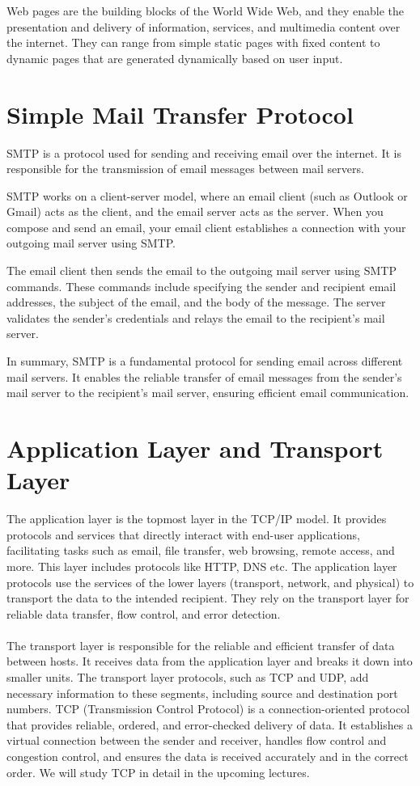\documentclass[a4paper,11pt]{scrarticle}
\begin{document}
Web pages are the building blocks of the World Wide Web, and they enable the presentation and delivery of information, services, and multimedia content over the internet. They can range from simple static pages with fixed content to dynamic pages that are generated dynamically based on user input.



\section{Simple Mail Transfer Protocol}
SMTP is a protocol used for sending and receiving email over the internet. It is responsible for the transmission of email messages between mail servers.

SMTP works on a client-server model, where an email client (such as Outlook or Gmail) acts as the client, and the email server acts as the server. When you compose and send an email, your email client establishes a connection with your outgoing mail server using SMTP.

The email client then sends the email to the outgoing mail server using SMTP commands. These commands include specifying the sender and recipient email addresses, the subject of the email, and the body of the message. The server validates the sender's credentials and relays the email to the recipient's mail server.

In summary, SMTP is a fundamental protocol for sending email across different mail servers. It enables the reliable transfer of email messages from the sender's mail server to the recipient's mail server, ensuring efficient email communication.


\section{Application Layer and Transport Layer}
The application layer is the topmost layer in the TCP/IP model. It provides protocols and services that directly interact with end-user applications, facilitating tasks such as email, file transfer, web browsing, remote access, and more. This layer includes protocols like HTTP, DNS etc. The application layer protocols use the services of the lower layers (transport, network, and physical) to transport the data to the intended recipient. They rely on the transport layer for reliable data transfer, flow control, and error detection.\\\\
The transport layer is responsible for the reliable and efficient transfer of data between hosts. It receives data from the application layer and breaks it down into smaller units. The transport layer protocols, such as TCP and UDP, add necessary information to these segments, including source and destination port numbers.
TCP (Transmission Control Protocol) is a connection-oriented protocol that provides reliable, ordered, and error-checked delivery of data. It establishes a virtual connection between the sender and receiver, handles flow control and congestion control, and ensures the data is received accurately and in the correct order. We will study TCP in detail in the upcoming lectures.
\end{document}
